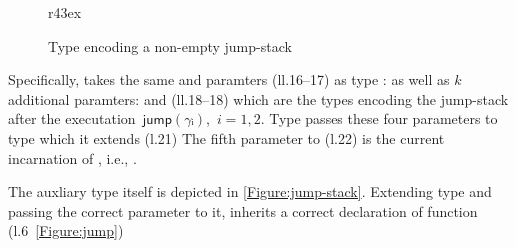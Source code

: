 \begin{wrapfigure}[10]r{43ex}
  \caption{\label{Figure:jump-stack-push} Type  encoding a non-empty jump-stack}
\end{wrapfigure}

Specifically,  takes 
the same  and  paramters (ll.16--17) as type :
  as well as $k$ additional paramters:
   and  (ll.18--18)
which are the types encoding the jump-stack
  after the executation~$\textsf{jump}(γᵢ)$,~$i=1,2$.
Type  passes these four parameters 
to type  which it extends (l.21)
The fifth parameter to  (l.22) is the current incarnation of , i.e., 
  .

The auxliary type  itself is depicted in \cref{Figure:jump-stack}.
Extending type  and passing the correct  parameter to it, 
 inherits a correct declaration of function  (l.6~\cref{Figure:jump}) 


